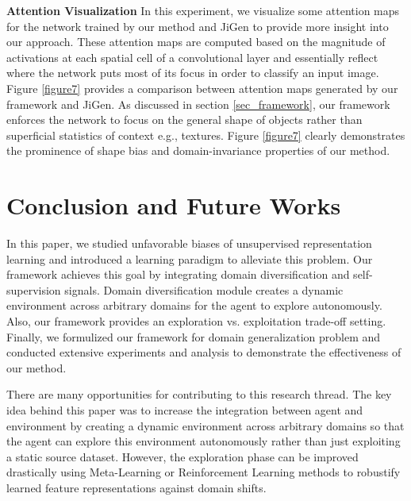 \documentclass[10pt,twocolumn,letterpaper]{article}
\begin{document}
\vspace{2mm}
\noindent
\textbf{Attention Visualization}\quad
In this experiment, we visualize some attention maps for the network trained by our method and JiGen\cite{carlucci2019domain} to provide more insight into our approach.
These attention maps are computed based on the magnitude of
activations at each spatial cell of a convolutional layer and essentially reflect where the network
puts most of its focus in order to classify an input image.
Figure \ref{figure7} provides a comparison between attention maps generated by our framework and JiGen\cite{carlucci2019domain}.
As discussed in section \ref{sec_framework}, our framework enforces the network to focus on the general shape of objects rather than superficial statistics of context e.g., textures.
Figure \ref{figure7} clearly demonstrates the prominence of shape bias and domain-invariance properties of our method.



\section{Conclusion and Future Works}
In this paper, we studied unfavorable biases of unsupervised representation learning and introduced a learning paradigm to alleviate this problem. Our framework achieves this goal by integrating domain diversification and self-supervision signals. 
Domain diversification module creates a dynamic environment across arbitrary domains for the agent to explore autonomously.
Also, our framework provides an exploration vs. exploitation trade-off setting. Finally, we formulized our framework for domain generalization problem and conducted extensive experiments and analysis to demonstrate the effectiveness of our method.

There are many opportunities for contributing to this research thread. The key idea behind this paper was to increase the integration between agent and environment by creating a dynamic environment across arbitrary domains so that the agent can explore this environment autonomously rather than just exploiting a static source dataset. However, the exploration phase can be improved drastically using Meta-Learning or Reinforcement Learning methods to robustify learned feature representations against domain shifts.

{\small


}
\end{document}
